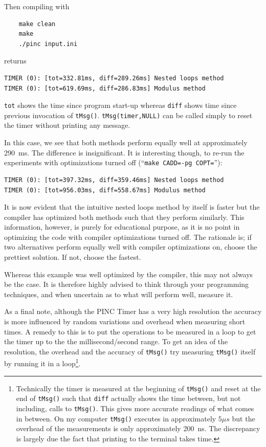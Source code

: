 \documentclass[10pt,a4paper]{article}
\begin{document}
Then compiling with
\begin{verbatim}
	make clean
	make
	./pinc input.ini
\end{verbatim}
returns

\begin{verbatim}
TIMER (0): [tot=332.81ms, diff=289.26ms] Nested loops method
TIMER (0): [tot=619.69ms, diff=286.83ms] Modulus method
\end{verbatim}
\verb$tot$ shows the time since program start-up whereas \verb$diff$ shows time since previous invocation of \lstinline$tMsg()$. \lstinline$tMsg(timer,NULL)$ can be called simply to reset the timer without printing any message.

In this case, we see that both methods perform equally well at approximately 290~ms. The difference is insignificant. It is interesting though, to re-run the experiments with optimizations turned off (``\verb$make CADD=-pg COPT=$''):

\begin{verbatim}
TIMER (0): [tot=397.32ms, diff=359.46ms] Nested loops method
TIMER (0): [tot=956.03ms, diff=558.67ms] Modulus method
\end{verbatim}
It is now evident that the intuitive nested loops method by itself is faster but the compiler has optimized both methods such that they perform similarly. This information, however, is purely for educational purpose, as it is no point in optimizing the code with compiler optimizations turned off. The rationale is; if two alternatives perform equally well with compiler optimizations on, choose the prettiest solution. If not, choose the fastest.

Whereas this example was well optimized by the compiler, this may not always be the case. It is therefore highly advised to think through your programming techniques, and when uncertain as to what will perform well, measure it.

As a final note, although the PINC Timer has a very high resolution the accuracy is more influenced by random variations and overhead when measuring short times. A remedy to this is to put the operations to be measured in a loop to get the timer up to the the millisecond/second range. To get an idea of the resolution, the overhead and the accuracy of \lstinline$tMsg()$ try measuring \lstinline$tMsg()$ itself by running it in a loop\footnote{Technically the timer is measured at the beginning of \lstinline$tMsg()$ and reset at the end of \lstinline$tMsg()$ such that \texttt{diff} actually shows the time between, but not including, calls to \lstinline$tMsg()$. This gives more accurate readings of what comes in between. On my computer \lstinline$tMsg()$ executes in approximately $5 \mu s$ but the overhead of the measurements is only approximately 200~ns. The discrepancy is largely due the fact that printing to the terminal takes time.}.
\end{document}
